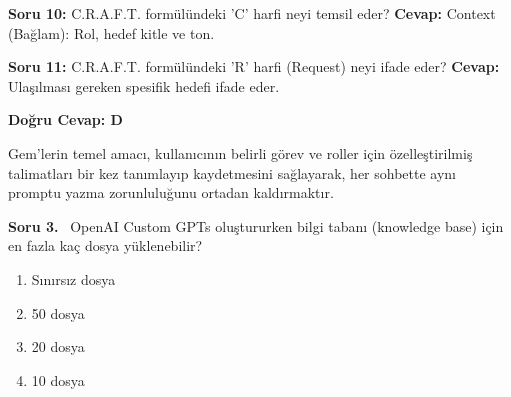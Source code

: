 \documentclass[11pt,a4paper,openany]{book}
\begin{document}
\vspace{6pt}
\needspace{3.5cm}
\begin{tcolorbox}[colback=white, colframe=secondarycolor!50!black, arc=1.2mm, boxrule=0.8pt, top=8pt, bottom=8pt, left=12pt, right=12pt, segmentation style={dashed, secondarycolor!30, line width=0.8pt}]
    \noindent\textbf{\color{red!80!black}\sffamily Soru 10:} C.R.A.F.T. formülündeki 'C' harfi neyi temsil eder?
\tcblower
    \noindent\textbf{\color{green!50!black}\sffamily Cevap:} Context (Bağlam): Rol, hedef kitle ve ton.
\end{tcolorbox}
\vspace{6pt}
\needspace{3.5cm}
\begin{tcolorbox}[colback=white, colframe=secondarycolor!50!black, arc=1.2mm, boxrule=0.8pt, top=8pt, bottom=8pt, left=12pt, right=12pt, segmentation style={dashed, secondarycolor!30, line width=0.8pt}]
    \noindent\textbf{\color{red!80!black}\sffamily Soru 11:} C.R.A.F.T. formülündeki 'R' harfi (Request) neyi ifade eder?
\tcblower
    \noindent\textbf{\color{green!50!black}\sffamily Cevap:} Ulaşılması gereken spesifik hedefi ifade eder.
\end{tcolorbox}
\vspace{6pt}
\needspace{3.5cm}
\begin{tcolorbox}[colback=white, colframe=secondarycolor!50!black, arc=1.2mm, boxrule=0.8pt, top=8pt, bottom=8pt, left=12pt, right=12pt, segmentation style={dashed, secondarycolor!30, line width=0.8pt}]
    \textbf{Doğru Cevap: D}

    \vspace{2pt}
    Gem'lerin temel amacı, kullanıcının belirli görev ve roller için özelleştirilmiş talimatları bir kez tanımlayıp kaydetmesini sağlayarak, her sohbette aynı promptu yazma zorunluluğunu ortadan kaldırmaktır.
\end{tcolorbox}
\vspace{10pt}
\needspace{5cm}
\vspace{8pt}
\noindent\textbf{\large\sffamily Soru 3.} \ OpenAI Custom GPTs oluştururken bilgi tabanı (knowledge base) için en fazla kaç dosya yüklenebilir?

\begin{enumerate}[label=\Alph*), leftmargin=25pt, topsep=4pt, itemsep=2pt]
        \item Sınırsız dosya
        \item 50 dosya
        \item 20 dosya
        \item 10 dosya
\end{enumerate}
\end{document}

